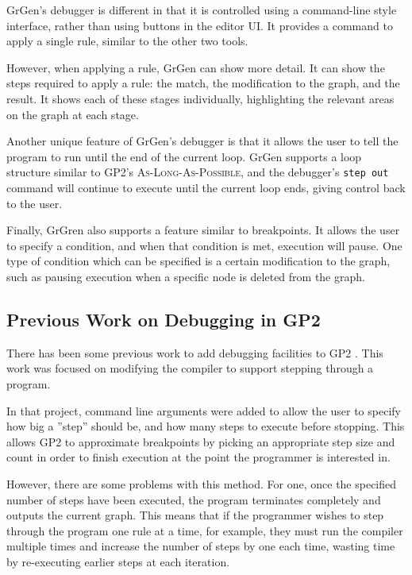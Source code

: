 \documentclass[authoryearcitations]{UoYCSproject}
\begin{document}
GrGen's debugger is different in that it is controlled using a command-line style
interface, rather than using buttons in the editor UI. It provides a command to
apply a single rule, similar to the other two tools.

However, when applying a rule, GrGen can show more detail. It can show the steps
required to apply a rule: the match, the modification to the graph, and the result.
It shows each of these stages individually, highlighting the relevant areas on the
graph at each stage.

Another unique feature of GrGen's debugger is that it allows the user to tell the
program to run until the end of the current loop. GrGen supports a loop structure
similar to GP2's \textsc{As-Long-As-Possible}, and the debugger's \texttt{step out}
command will continue to execute until the current loop ends, giving control back
to the user.

Finally, GrGren also supports a feature similar to breakpoints. It allows the user
to specify a condition, and when that condition is met, execution will pause. One
type of condition which can be specified is a certain modification to the graph,
such as pausing execution when a specific node is deleted from the graph.


\subsection{Previous Work on Debugging in GP2}
\label{sec:PreviousWorkOnDebuggingInGP2}

There has been some previous work to add debugging facilities to GP2 \citep{taylor2016}.
This work was focused on modifying the compiler to support stepping through a
program.

In that project, command line arguments were added to allow the user to specify
how big a ''step'' should be, and how many steps to execute before stopping.
This allows GP2 to approximate breakpoints by picking an appropriate step size
and count in order to finish execution at the point the programmer is interested in.

However, there are some problems with this method. For one, once the specified
number of steps have been executed, the program terminates completely and outputs
the current graph. This means that if the programmer wishes to step through the
program one rule at a time, for example, they must run the compiler multiple times
and increase the number of steps by one each time, wasting time by re-executing
earlier steps at each iteration.
\end{document}

